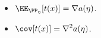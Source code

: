 \begin{theorem}
\claimlabel

\begin{itemize}
    \item $\displaystyle \EE_{\PP_{\eta}}[t(x)] = \nabla a(\eta)$.
    \item $\displaystyle \cov[t(x)] = \nabla^2 a(\eta)$. 
\end{itemize}
\end{theorem}